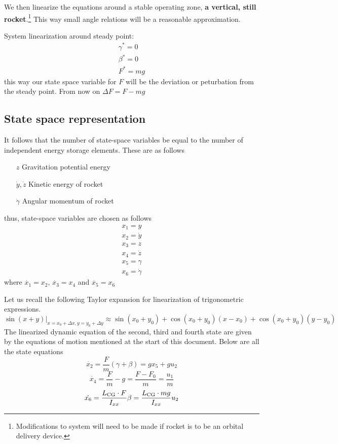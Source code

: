 \documentclass[11pt, titlepage]{article}
\begin{document}
We then linearize the equations around a stable operating zone, \textbf{a vertical, still rocket}.\footnote{Modifications to system will need to be made if rocket is to be an orbital delivery device.} This way  small angle relations will be a reasonable approximation.

System linearization around steady point:
\begin{align*}
	\gamma^* = 0 \\
	\beta^* = 0 \\
	F^* = mg
\end{align*}
this way our state space variable for $F$ will be the deviation or peturbation from the steady point. From now on $\Delta F = F- mg$
\subsection{State space representation}
It follows that the number of state-space variables be equal to the number of independent energy storage elements. These are as follows

\begin{enumerate}
	\item[$z$] Gravitation potential energy
	\item[$\dot{y},\dot{z}$] Kinetic energy of rocket
	\item[$\dot{\gamma}$] Angular momentum of rocket
\end{enumerate}
thus, state-space variables are chosen as follows
\begin{align*}
	x_1 = y \\
	x_2 = \dot{y} \\
	x_3 = z \\
	x_4 = \dot{z} \\
	x_5 = \gamma \\
	x_6 = \dot{\gamma}
\end{align*}
where $\dot{x_1} = x_2$, $\dot{x_3} = x_4$ and $\dot{x_5} = x_6$

Let us recall the following Taylor expansion for linearization of trigonometric expressions.
\[
\sin(x+y)|_{x=x_0+\Delta x,y=y_0+\Delta y} \approx \sin(x_0+y_0) + \cos(x_0 + y_0) (x-x_0) + \cos(x_0 + y_0) (y-y_0)
\]
The linearized dynamic equation of the second, third and fourth state are given by the equations of motion mentioned at the start of this document. Below are all the state equations
\begin{equation}
	\dot{x_2} = \frac{F}{m} \left( \gamma+\beta \right) = g x_5 + g u_2 
\end{equation}
\begin{equation}
\dot{x_4} = \frac{F}{m} - g =\frac{F-F_0}{m}= \frac{u_1}{m}
\end{equation}
\begin{equation}
\dot{x_6} = \frac{L_{\mathrm{CG}} \cdot F}{I_{xx}} \beta = \frac{L_{\mathrm{CG}} \cdot mg}{I_{xx}} u_2 
\end{equation}
\end{document}
